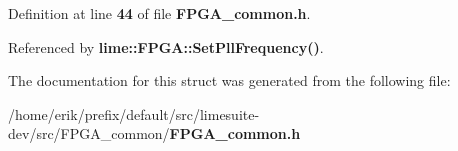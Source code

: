 Definition at line {\bf 44} of file {\bf F\+P\+G\+A\+\_\+common.\+h}.



Referenced by {\bf lime\+::\+F\+P\+G\+A\+::\+Set\+Pll\+Frequency()}.



The documentation for this struct was generated from the following file\+:\begin{DoxyCompactItemize}
\item 
/home/erik/prefix/default/src/limesuite-\/dev/src/\+F\+P\+G\+A\+\_\+common/{\bf F\+P\+G\+A\+\_\+common.\+h}\end{DoxyCompactItemize}
